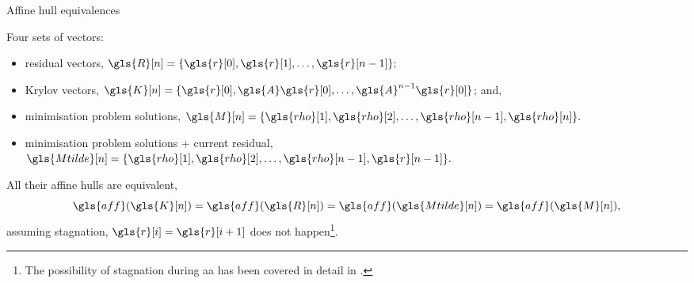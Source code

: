 \documentclass[aspectratio=169]{beamer}
\begin{document}
\begin{frame}{Affine hull equivalences}

Four sets of vectors:
\begin{itemize}
    \item residual vectors, $\gls{R}[n] = \{\gls{r}[0],\gls{r}[1],\dots, \gls{r}[n-1]\};$
    \item Krylov vectors, $\gls{K}[n] %
    = \{ \gls{r}[0], \gls{A} \gls{r}[0], \ldots, \gls{A}^{n-1} \gls{r}[0] \}$; and,
    \item minimisation problem solutions, $\gls{M}[n] =
        \{\gls{rho}[1],\gls{rho}[2],\dots, \gls{rho}[n-1], \gls{rho}[n]\}.$
    \item minimisation problem solutions + current residual, $\gls{Mtilde}[n] =
        \{\gls{rho}[1],\gls{rho}[2],\dots, \gls{rho}[n-1], \gls{r}[n-1]\}.$
\end{itemize}
\parencite{Bretschneider2025} All their affine hulls are equivalent,
\begin{equation}
    \gls{aff}(\gls{K}[n]) = \gls{aff}(\gls{R}[n]) = \gls{aff}(\gls{Mtilde}[n]) = \gls{aff}(\gls{M}[n]),
\end{equation}
assuming stagnation, $\gls{r}[i] = \gls{r}[i+1]$ does not happen\footnote{The
    possibility of stagnation during \gls{aa} has been covered in detail in
    \parencite{Potra2011}.}.


\end{frame}
\end{document}
